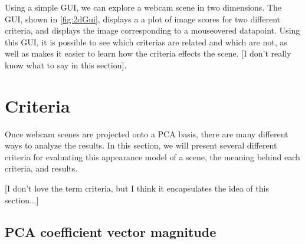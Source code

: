 Using a simple GUI, we can explore a webcam scene in two dimensions.  The GUI, shown in \ref{fig:2dGui}, displays a a plot of image scores for two different criteria, and displays the image corresponding to a mouseovered datapoint.  Using this GUI, it is possible to see which criterias are related and which are not, as well as makes it easier to learn how the criteria effects the scene. [I don't really know what to say in this section].


\section{Criteria}

Once webcam scenes are projected onto a PCA basis, there are many different ways to analyze the results.  In this section, we will present several different criteria for evaluating this appearance model of a scene, the meaning behind each criteria, and results.

[I don't love the term criteria, but I think it encapsulates the idea of this section...]

\subsection{PCA coefficient vector magnitude}

